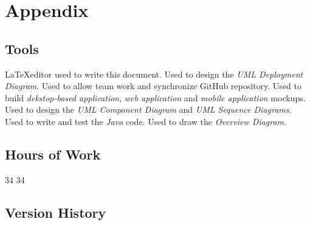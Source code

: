 \section{Appendix}
\subsection{Tools}
\begin{itemize}
	 \LaTeX editor used to write this document.
	 Used to design the \textit{UML Deployment Diagram}.
	 Used to allow team work and synchronize GitHub repository.
	 Used to build \textit{dekstop-based application}, \textit{web application} and \textit{mobile application} mockups.
	 Used to design the \textit{UML Component Diagram} and \textit{UML Sequence Diagrams}.
	 Used to write and test the \textit{Java} code.
	 Used to draw the \textit{Overview Diagram}.
\end{itemize}
\subsection{Hours of Work}
\begin{itemize}
	 34
	 34
\end{itemize}
\subsection{Version History}
